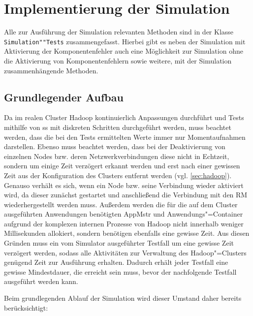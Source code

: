 \section{Implementierung der Simulation}
\label{sec:implSimulation}

Alle zur Ausführung der Simulation relevanten Methoden sind in der Klasse \texttt{Simulation""Tests} zusammengefasst.
Hierbei gibt es neben der Simulation mit Aktivierung der Komponentenfehler auch eine Möglichkeit zur Simulation ohne die Aktivierung von Komponentenfehlern sowie weitere, mit der Simulation zusammenhängende Methoden.

\subsection{Grundlegender Aufbau}
\label{subsec:simulationBasics}

Da im realen Cluster Hadoop kontinuierlich Anpassungen durchführt und Tests mithilfe von \gls{ss} mit diskreten Schritten durchgeführt werden, muss beachtet werden, dass die bei den Tests ermittelten Werte immer nur Momentaufnahmen darstellen.
Ebenso muss beachtet werden, dass bei der Deaktivierung von einzelnen Nodes bzw. deren Netzwerkverbindungen diese nicht in Echtzeit, sondern um einige Zeit verzögert erkannt werden und erst nach einer gewissen Zeit aus der Konfiguration des Clusters entfernt werden (vgl. \cref{sec:hadoop}).
Genauso verhält es sich, wenn ein Node bzw. seine Verbindung wieder aktiviert wird, da dieser zunächst gestartet und anschließend die Verbindung mit den \gls{RM} wiederhergestellt werden muss.
Außerdem werden die für die auf dem Cluster ausgeführten Anwendungen benötigten \gls{AppMstr} und Anwendungs"=Container aufgrund der komplexen internen Prozesse von Hadoop nicht innerhalb weniger Millisekunden allokiert, sondern benötigen ebenfalls eine gewisse Zeit.
Aus diesen Gründen muss ein vom Simulator ausgeführter Testfall um eine gewisse Zeit verzögert werden, sodass alle Aktivitäten zur Verwaltung des Hadoop"=Clusters genügend Zeit zur Ausführung erhalten.
Dadurch erhält jeder Testfall eine gewisse Mindestdauer, die erreicht sein muss, bevor der nachfolgende Testfall ausgeführt werden kann.

Beim grundlegenden Ablauf der Simulation wird dieser Umstand daher bereits berücksichtigt:

